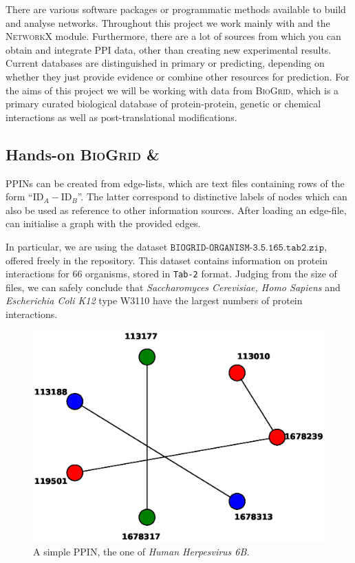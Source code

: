 \label{sec:2-task1}
There are various software packages or programmatic methods available to build and analyse networks. Throughout this project we work mainly with \PY and the \textsc{NetworkX} module. Furthermore, there are a lot of sources from which you can obtain and integrate PPI data, other than creating new experimental results. Current databases are distinguished in primary or predicting, depending on whether they just provide evidence or combine other resources for prediction. For the aims of this project we will be working with data from \textsc{BioGrid}, which is a primary curated biological database of protein-protein, genetic or chemical interactions as well as post-translational modifications.

\subsection{Hands-on \textsc{BioGrid} \& \NX }

PPINs can be created from edge-lists, which are text files containing rows of the form ``$\text{ID}_A - \text{ID}_B$''. The latter correspond to distinctive labels of nodes which can also be used as reference  to other information sources. After loading an edge-file, \NX  can initialise a graph with the provided edges.

In particular, we are using the dataset $\texttt{BIOGRID-ORGANISM-3.5.165.tab2.zip}$, offered freely in the \BGRD repository. This dataset contains information on protein interactions for $66$ organisms, stored in \texttt{Tab-2} format. Judging from the size of files, we can safely conclude that \textit{Saccharomyces Cerevisiae, Homo Sapiens} and \textit{Escherichia Coli K12} type W3110 have the largest numbers of protein interactions. 

\begin{figure}
	\vspace{-25pt}
    \hspace{-80pt}
    \flushleft
	\includegraphics[width=.99\linewidth]{Graphics/Human_Herpesvirus_6Bgraph.eps}
	\caption{A simple PPIN, the one of \textit{Human Herpesvirus 6B}.}
	\label{fig:examplePPIN}
    \vspace{-10pt}
\end{figure}

